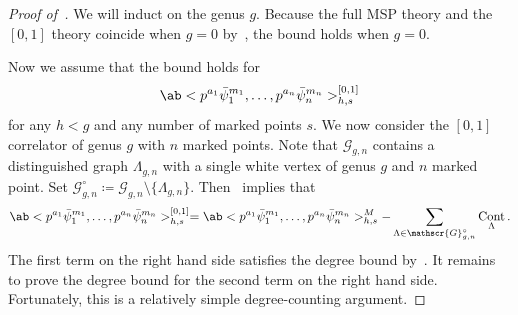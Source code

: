\documentclass[10pt]{amsart}
\theoremstyle{definition}
\theoremstyle{remark}
\theoremstyle{plain}
\theoremstyle{definition}
\theoremstyle{remark}
\newcommand{\msc}[1]{\mathscr{#1}}
\newcommand{\1}{\mathbf{1}}
\newcommand{\2}{\mathbf{2}}
\newcommand{\3}{\mathbf{3}}
\DeclareMathOperator{\Cont}{Cont}
\numberwithin{equation}{section}
\begin{document}
\begin{proof}[Proof of~]
    We will induct on the genus $g$. Because the full MSP theory and the $[0,1]$ theory coincide when $g=0$ by~, the bound holds when $g=0$.

    Now we assume that the bound holds for
    \[ \ab<p^{a_1} \bar{\psi}_1^{m_1}, \ldots, p^{a_n} \bar{\psi}_n^{m_n}>_{h,s}^{[0,1]} \]
    for any $h < g$ and any number of marked points $s$. We now consider the $[0,1]$ correlator of genus $g$ with $n$ marked points. Note that $\msc{G}_{g,n}$ contains a distinguished graph $\Lambda_{g,n}$ with a single white vertex of genus $g$ and $n$ marked point. Set $\msc{G}_{g,n}^{\circ} \coloneqq \msc{G}_{g,n} \setminus \{\Lambda_{g,n}\}$. Then~ implies that
    \[ \ab<p^{a_1} \bar{\psi}_1^{m_1}, \ldots, p^{a_n} \bar{\psi}_n^{m_n}>_{h,s}^{[0,1]} = \ab<p^{a_1} \bar{\psi}_1^{m_1}, \ldots, p^{a_n} \bar{\psi}_n^{m_n}>_{h,s}^{M} - \sum_{\Lambda \in \msc{G}_{g,n}^{\circ}} \Cont_{\Lambda}. \]
    The first term on the right hand side satisfies the degree bound by~. It remains to prove the degree bound for the second term on the right hand side. Fortunately, this is a relatively simple degree-counting argument.


\end{proof}
\end{document}
